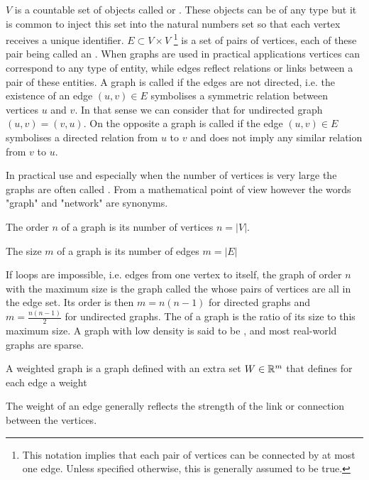 $V$ is a countable set of objects called  or . These objects can be of any type but it is common to inject this set into the natural numbers set so that each vertex receives a unique identifier.
$E \subset V\times V$ \footnote{This notation implies that each pair of vertices can be connected by at most one edge. Unless specified otherwise, this is generally assumed to be true.} is a set of pairs of vertices, each of these pair being called an .
When graphs are used in practical applications vertices can correspond to any type of entity, while edges reflect relations or links between a pair of these entities. A graph is called  if the edges are not directed, i.e. the existence of an edge $(u, v) \in E$ symbolises a symmetric relation between vertices $u$ and $v$. In that sense we can consider that for undirected graph $(u, v) = (v, u)$. On the opposite a graph is called  if the edge $(u,v) \in E$ symbolises a directed relation from $u$ to $v$ and does not imply any similar relation from $v$ to $u$.

In practical use and especially when the number of vertices is very large the graphs are often called . From a mathematical point of view however the words "graph" and "network" are synonyms.

\begin{definition}
    The order $n$ of a graph is its number of vertices $n = |V|$.

    The size $m$ of a graph is its number of edges $m = |E|$
\end{definition}

If loops are impossible, i.e. edges from one vertex to itself, the graph of order $n$ with the maximum size is the graph called the  whose pairs of vertices are all in the edge set. Its order is then $m = n(n-1)$ for directed graphs and $m=\frac{n(n-1)}{2}$ for undirected graphs. The  of a graph is the ratio of its size to this maximum size. A graph with low density is said to be , and most real-world graphs are sparse.

\begin{definition}
    A weighted graph is a graph defined with an extra set $W \in \mathbb{R}^m$ that defines for each edge a weight
\end{definition}

The weight of an edge generally reflects the strength of the link or connection between the vertices.


